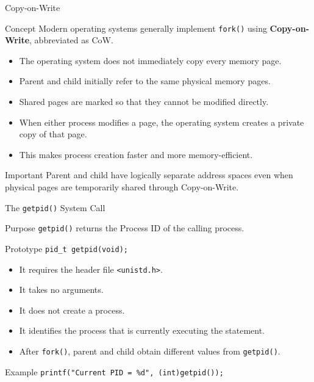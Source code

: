 \documentclass[aspectratio=169]{beamer}
\begin{document}
\begin{frame}{Copy-on-Write}

\begin{block}{Concept}
Modern operating systems generally implement \texttt{fork()} using
\textbf{Copy-on-Write}, abbreviated as CoW.
\end{block}

\begin{itemize}
    \item The operating system does not immediately copy every memory page.
    \item Parent and child initially refer to the same physical memory pages.
    \item Shared pages are marked so that they cannot be modified directly.
    \item When either process modifies a page, the operating system creates a
    private copy of that page.
    \item This makes process creation faster and more memory-efficient.
\end{itemize}

\begin{alertblock}{Important}
Parent and child have logically separate address spaces even when physical pages
are temporarily shared through Copy-on-Write.
\end{alertblock}

\end{frame}

\begin{frame}{The \texttt{getpid()} System Call}

\begin{block}{Purpose}
\texttt{getpid()} returns the Process ID of the calling process.
\end{block}

\begin{block}{Prototype}
\centering
\texttt{pid\_t getpid(void);}
\end{block}

\begin{itemize}
    \item It requires the header file \texttt{<unistd.h>}.
    \item It takes no arguments.
    \item It does not create a process.
    \item It identifies the process that is currently executing the statement.
    \item After \texttt{fork()}, parent and child obtain different values from
    \texttt{getpid()}.
\end{itemize}

\begin{exampleblock}{Example}
\centering
\texttt{printf("Current PID = \%d", (int)getpid());}
\end{exampleblock}

\end{frame}
\end{document}
